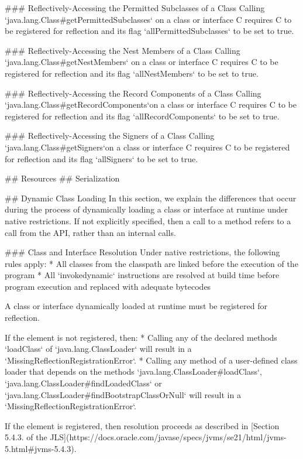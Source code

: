### Reflectively-Accessing the Permitted Subclasses of a Class
Calling `java.lang.Class#getPermittedSubclasses` on a class or interface C requires C to be registered for reflection
and its flag `allPermittedSubclasses` to be set to true.

### Reflectively-Accessing the Nest Members of a Class
Calling `java.lang.Class#getNestMembers` on a class or interface C requires C to be registered for reflection 
and its flag `allNestMembers` to be set to true.

### Reflectively-Accessing the Record Components of a Class
Calling `java.lang.Class#getRecordComponents`on a class or interface C requires C to be registered for reflection
and its flag `allRecordComponents` to be set to true.

### Reflectively-Accessing the Signers of a Class
Calling `java.lang.Class#getSigners`on a class or interface C requires C to be registered for reflection
and its flag `allSigners` to be set to true.

## Resources
## Serialization

## Dynamic Class Loading
In this section, we explain the differences that occur during the process of dynamically loading
a class or interface at runtime under native restrictions. 
If not explicitly specified, then a call to a method refers to a call from the API, 
rather than an internal calls.

### Class and Interface Resolution
Under native restrictions, the following rules apply: 
* All classes from the classpath are linked before the execution of the program
* All `invokedynamic` instructions are resolved at build time before program execution and replaced
  with adequate bytecodes

A class or interface dynamically loaded at runtime must be registered for reflection.

If the element is not registered, then:
* Calling any of the declared methods `loadClass` of `java.lang.ClassLoader` will result in a 
`MissingReflectionRegistrationError`.
* Calling any method of a user-defined class loader that depends on the methods `java.lang.ClassLoader#loadClass`, 
`java.lang.ClassLoader#findLoadedClass` or `java.lang.ClassLoader#findBootstrapClassOrNull` 
will result in a `MissingReflectionRegistrationError`.

If the element is registered, then resolution proceeds as described in 
[Section 5.4.3. of the JLS](https://docs.oracle.com/javase/specs/jvms/se21/html/jvms-5.html#jvms-5.4.3).

